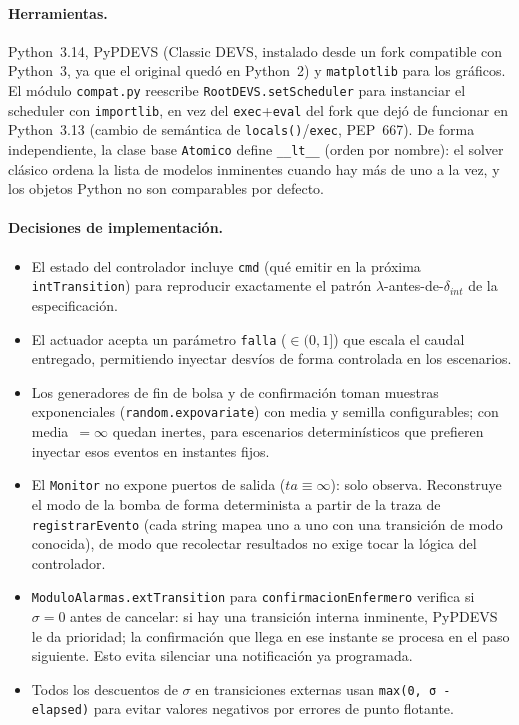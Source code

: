 \documentclass[11pt,a4paper]{article}
\begin{document}
\paragraph{Herramientas.} Python~3.14, PyPDEVS (Classic DEVS, instalado desde un fork compatible con Python~3, ya que el original quedó en Python~2) y \texttt{matplotlib} para los gráficos. El módulo \texttt{compat.py} reescribe \texttt{RootDEVS.setScheduler} para instanciar el scheduler con \texttt{importlib}, en vez del \texttt{exec}+\texttt{eval} del fork que dejó de funcionar en Python~3.13 (cambio de semántica de \texttt{locals()}/\texttt{exec}, PEP~667). De forma independiente, la clase base \texttt{Atomico} define \texttt{\_\_lt\_\_} (orden por nombre): el solver clásico ordena la lista de modelos inminentes cuando hay más de uno a la vez, y los objetos Python no son comparables por defecto.

\paragraph{Decisiones de implementación.}
\begin{itemize}
  \item El estado del controlador incluye \texttt{cmd} (qué emitir en la próxima \texttt{intTransition}) para reproducir exactamente el patrón $\lambda$-antes-de-$\delta_{int}$ de la especificación.
  \item El actuador acepta un parámetro \texttt{falla} ($\in (0,1]$) que escala el caudal entregado, permitiendo inyectar desvíos de forma controlada en los escenarios.
  \item Los generadores de fin de bolsa y de confirmación toman muestras exponenciales (\texttt{random.expovariate}) con media y semilla configurables; con media~$=\infty$ quedan inertes, para escenarios determinísticos que prefieren inyectar esos eventos en instantes fijos.
  \item El \texttt{Monitor} no expone puertos de salida ($ta \equiv \infty$): solo observa. Reconstruye el modo de la bomba de forma determinista a partir de la traza de \texttt{registrarEvento} (cada string mapea uno a uno con una transición de modo conocida), de modo que recolectar resultados no exige tocar la lógica del controlador.
  \item \texttt{ModuloAlarmas.extTransition} para \texttt{confirmacionEnfermero} verifica si $\sigma = 0$ antes de cancelar: si hay una transición interna inminente, PyPDEVS le da prioridad; la confirmación que llega en ese instante se procesa en el paso siguiente. Esto evita silenciar una notificación ya programada.
  \item Todos los descuentos de $\sigma$ en transiciones externas usan \texttt{max(0, σ - elapsed)} para evitar valores negativos por errores de punto flotante.
\end{itemize}
\end{document}
